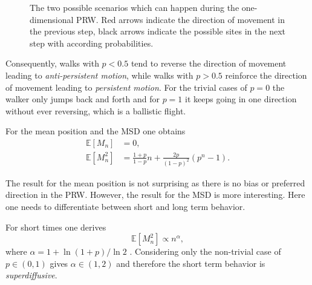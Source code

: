 \begin{figure}[bth]
    \myfloatalign
     \quad
    \caption[\acs{PRW} on a one-dimensional lattice]{The two possible scenarios which can happen during the one-dimensional \acs{PRW}. Red arrows indicate the direction of movement in the previous step, black arrows indicate the possible sites in the next step with according probabilities.}\label{fig:1DPRW}
\end{figure}

Consequently, walks with $p < 0.5$ tend to reverse the direction of movement leading to \textit{anti-persistent motion}, while walks with $p > 0.5$ reinforce the direction of movement leading to \textit{persistent motion}. For the trivial cases of $p = 0$ the walker only jumps back and forth and for $p = 1$ it keeps going in one direction without ever reversing, which is a ballistic flight.

For the mean position and the \acs{MSD} one obtains \cite{shaebani:2014}
\begin{align*}
 \mathbb{E}\left[M_n\right] &= 0,
 \\
 \mathbb{E}\left[M^2_n\right] &= \frac{1+p}{1-p}n + \frac{2p}{\left(1-p\right)^2}\left(p^n-1\right).
\end{align*}

The result for the mean position is not surprising as there is no bias or preferred direction in the \acs{PRW}. However, the result for the \acs{MSD} is more interesting. Here one needs to differentiate between short and long term behavior.

For short times one derives
\begin{equation*}
 \mathbb{E}\left[M^2_n\right]\propto n^\alpha,
\end{equation*}
where $\alpha = 1+\ln\left(1+p\right)/\ln{2}$ \cite{shaebani:2014}. Considering only the non-trivial case of $p\in\left(0,1\right)$ gives $\alpha\in\left(1,2\right)$ and therefore the short term behavior is \textit{superdiffusive}.

